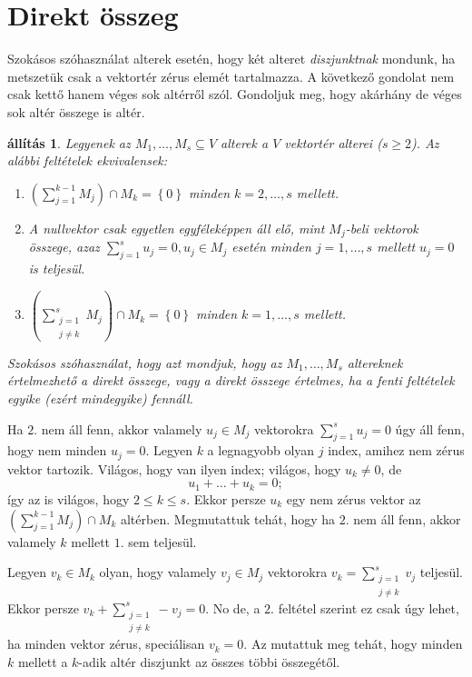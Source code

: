 \documentclass[a4paper, showtrims]{memoir}
\makeatletter
\renewenvironment{proof}[1][\proofname]
    {\par\pushQED{\qed}%
    \normalfont \topsep6\p@\@plus6\p@\relax
    \trivlist
    \item[\hskip\labelsep
        \itshape
    #1\@addpunct{:}]\ignorespaces}
    {\popQED\endtrivlist\@endpefalse}
\theoremstyle{plain}
\newtheorem{proposition}{állítás}[chapter]
\theoremstyle{remark}
\theoremstyle{definition}
\makeatother
\begin{document}
\section{Direkt összeg}
Szokásos szóhasználat alterek esetén, hogy két alteret \emph{diszjunktnak}
mondunk,
ha metszetük csak a vektortér zérus elemét tartalmazza.
A következő gondolat nem csak kettő hanem véges sok altérről szól.
Gondoljuk meg, hogy akárhány de véges sok altér összege is altér.
\begin{proposition}
    \label{pr:direktosszegsorrend}
    Legyenek az $M_1,\ldots,M_s\subseteq V$ alterek a $V$ vektortér alterei ($s\geq 2$).
    Az alábbi feltételek ekvivalensek:
    \begin{enumerate}
		\item 
            $\left( \sum_{j=1}^{k-1}M_j \right)\cap M_k
			=
			\left\{ 0 \right\}
            $
		    minden $k=2,\ldots,s$ mellett.
        \item
            A nullvektor csak egyetlen egyféleképpen áll elő, mint $M_j$-beli vektorok összege,
            azaz $\sum_{j=1}^su_j=0, u_j\in M_j$ esetén minden $j=1,\ldots,s$ mellett $u_j=0$ is teljesül.
        \item
            $\left( \sum_{\substack{j=1\\j\neq k}}^sM_j \right)\cap M_k
			=
			\left\{ 0 \right\}
            $
		    minden $k=1,\ldots,s$ mellett.
    \end{enumerate}
    Szokásos szóhasználat, hogy azt mondjuk, hogy az $M_1,\ldots,M_s$ altereknek \emph{értelmezhető a direkt összege},   vagy a \emph{direkt összege értelmes}, ha a fenti feltételek egyike (ezért mindegyike) fennáll.
\end{proposition}
\begin{proof}[Az $1.\Rightarrow 2.$ igazolása]
    Ha $2.$ nem áll fenn, akkor valamely $u_j\in M_j$ vektorokra $\sum_{j=1}^su_j=0$ úgy áll fenn,
    hogy nem minden $u_j=0$.
    Legyen $k$ a legnagyobb olyan $j$ index, amihez nem zérus vektor tartozik.
    Világos, hogy van ilyen index; 
    világos, hogy $u_k\neq 0$, de
    \[
        u_1+\dots+u_k=0;
    \]
    így az is világos, hogy $2\leq k\leq s$.
    Ekkor persze $u_k$ egy nem zérus vektor az $\left( \sum_{j=1}^{k-1}M_j \right)\cap M_k$ altérben.
    Megmutattuk tehát, hogy ha $2.$ nem áll fenn, akkor valamely $k$ mellett $1.$ sem teljesül.
\end{proof}
\begin{proof}[A $2.\Rightarrow 3.$ igazolása]
        Legyen $v_k\in M_k$ olyan, hogy valamely $v_j\in M_j$ vektorokra 
        $v_k=\sum_{\substack{j=1\\j\neq k}}^sv_j$
        teljesül. 
        Ekkor persze 
        $v_k+\sum_{\substack{j=1\\j\neq k}}^s-v_j=0$. 
        No de, a $2.$ feltétel szerint ez csak úgy lehet, ha minden vektor zérus, speciálisan $v_k=0$.
        Az mutattuk meg tehát, hogy minden $k$ mellett a $k$-adik altér diszjunkt az összes többi összegétől.
\end{proof}
\end{document}

